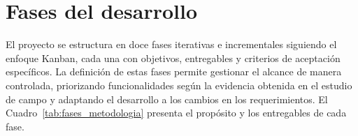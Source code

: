 \section{Fases del desarrollo}

El proyecto se estructura en doce fases iterativas e incrementales siguiendo el enfoque Kanban, cada una con objetivos, entregables y criterios de aceptación específicos. La definición de estas fases permite gestionar el alcance de manera controlada, priorizando funcionalidades según la evidencia obtenida en el estudio de campo y adaptando el desarrollo a los cambios en los requerimientos. El Cuadro~\ref{tab:fases_metodologia} presenta el propósito y los entregables de cada fase.



